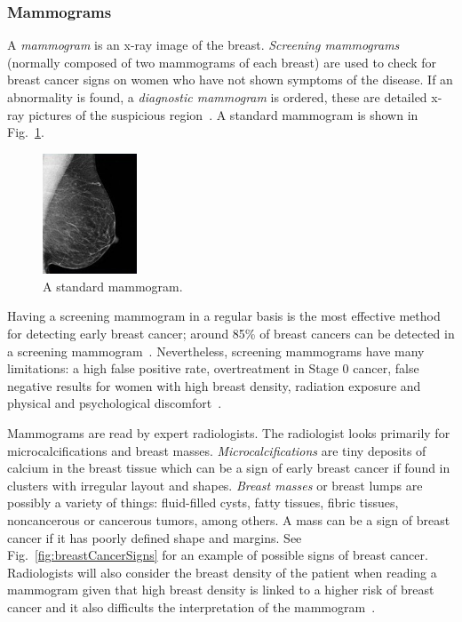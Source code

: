 \subsubsection{Mammograms}
A \emph{mammogram} is an x-ray image of the breast. \emph{Screening mammograms} (normally composed of two mammograms of each breast) are used to check for breast cancer signs on women who have not shown symptoms of the disease. If an abnormality is found, a \emph{diagnostic mammogram} is ordered, these are detailed x-ray pictures of the suspicious region~\cite{Mammograms2014}. A standard mammogram is shown in Fig.~\ref{fig:normalMammogram}.

\begin{figure}[h]
	\centering
	\includegraphics[width = 0.25\textwidth]{plots/normalMammogram.jpg}
	\caption[Digital Mammogram]{A standard mammogram.}
	\label{fig:normalMammogram}
\end{figure}

Having a screening mammogram in a regular basis is the most effective method for detecting early breast cancer; around 85\% of breast cancers can be detected in a screening mammogram~\cite{PerformanceMammography2013}. Nevertheless, screening mammograms have many limitations: a high false positive rate, overtreatment in Stage 0 cancer, false negative results for women with high breast density, radiation exposure and physical and psychological discomfort~\cite{Mammograms2014}.

Mammograms are read by expert radiologists. The radiologist looks primarily for microcalcifications and breast masses. \emph{Microcalcifications} are tiny deposits of calcium in the breast tissue which can be a sign of early breast cancer if found in clusters with irregular layout and shapes. \emph{Breast masses} or breast lumps are possibly a variety of things: fluid-filled cysts, fatty tissues, fibric tissues, noncancerous or cancerous tumors, among others. A mass can be a sign of breast cancer if it has poorly defined shape and margins. See Fig.~\ref{fig:breastCancerSigns} for an example of possible signs of breast cancer. Radiologists will also consider the breast density of the patient when reading a mammogram given that high breast density is linked to a higher risk of breast cancer and it also difficults the interpretation of the mammogram~\cite{MammogramsACS2014}.

